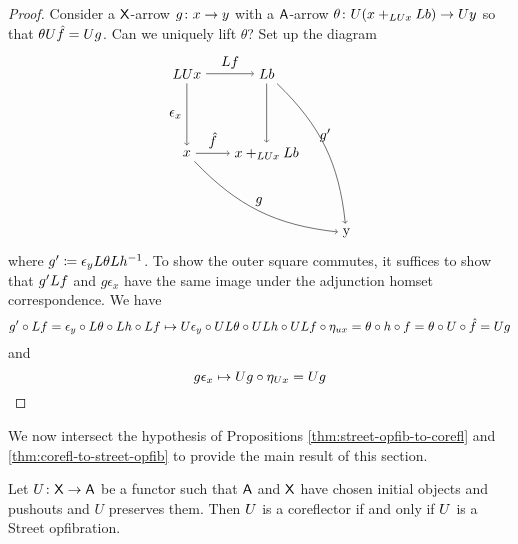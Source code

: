 \documentclass{amsart}
\begin{document}
\begin{proof}
  Consider a $ \mathsf{X} $-arrow $ g \colon x \to y $
  with a $ \mathsf{A} $-arrow
  $ \theta \colon U( x +_{LU x} L b ) \to U y $ so
  that $ \theta U \hat{f} = U g $.  Can we
  uniquely lift $ \theta $? Set up the diagram
  \[
    \begin{tikzpicture}
      \node (ul) at (0,2) {$ \L\U x $};
      \node (ll) at (0,0) {$ x $};
      \node (ur) at (2,2) {$ \L b $};
      \node (lr) at (2,0) {$ x +_{\L\U x} \L b$};
      \node (comp) at (4,-2) {y};
      \draw [->] (ul) to node [left] {$ \epsilon_x $} (ll);
      \draw [->] (ul) to node [above] {$ \L f $} (ur);
      \draw [->] (ll) to node [above] {$ \hat{f} $} (lr);
      \draw [->] (ur) to (lr);
      \draw [->] (ll) to [bend right=20] node [above] {$ g $} (comp);
      \draw [->] (ur) to [bend left=20] node [above] {$ g' $} (comp);
    \end{tikzpicture}
  \] 
  where $ g' \coloneqq \epsilon_y L\theta L h^{-1} $.
  To show the outer square commutes, it suffices
  to show that $ g' L f $ and $ g \epsilon_x $
  have the same image under the adjunction homset
  correspondence.  We have
  \[
    g' \circ L f =
    \epsilon_y \circ L\theta \circ L h \circ L f
    \mapsto
    U\epsilon_y \circ UL\theta \circ UL h
      \circ UL f \circ\eta_{ux}
    = \theta \circ h \circ f   
    = \theta \circ U \circ \hat{f} 
    = U g
  \]
  and 
  \[
    g \epsilon_x
    \mapsto
    U g \circ \eta_{U x}
    = U g
  \]
\end{proof}

We now intersect the hypothesis of Propositions
\cref{thm:street-opfib-to-corefl} and
\cref{thm:corefl-to-street-opfib} to provide the
main result of this section.

\begin{thm}
  \label{thm:main-theorem-street-version}
  Let $ U \colon \mathsf{X} \to \mathsf{A} $ be a functor such that $ \mathsf{A} $
  and $ \mathsf{X} $ have chosen initial objects and pushouts and
  $ U $ preserves them. Then $ U $ is a coreflector if and
  only if $ U $ is a Street opfibration.
\end{thm}
\end{document}
